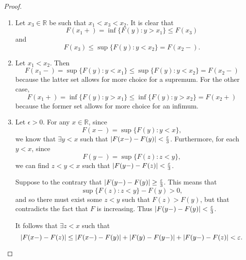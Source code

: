 \documentclass[notoc,notitlepage]{tufte-book}
\begin{document}
\begin{proof}
  \begin{enumerate}
    \item Let $x_3 \in \mathbb{R}$ be such that $x_1 < x_3 < x_2$.
      It is clear that
      \begin{equation*}
        F(x_1+) = \inf \{ F(y) : y > x_1 \} \leq F(x_3)
      \end{equation*}
      and
      \begin{equation*}
        F(x_3) \leq \sup \{ F(y) : y < x_2 \} = F(x_2-).
      \end{equation*}

    \item Let $x_1 < x_2$. Then
      \begin{equation*}
        F(x_1-) = \sup \{ F(y) : y < x_1 \} \leq \sup \{ F(y) : y < x_2 \} =
        F(x_2-)
      \end{equation*}
      because the latter set allows for more choice for a supremum.
      For the other case,
      \begin{equation*}
        F(x_1+) = \inf \{ F(y) : y > x_1 \} \leq \inf \{ F(y) : y > x_2 \} =
        F(x_2+)
      \end{equation*}
      because the former set allows for more choice for an infimum.

    \item Let $\epsilon > 0$. For any $x \in \mathbb{R}$, since
      \begin{equation*}
        F(x-) = \sup \{ F(y) : y < x \},
      \end{equation*}
      we know that $\exists y < x$ such that $\left|F(x-) - F(y)\right| <
      \frac{\varepsilon}{3}$.
      Furthermore, for each $y < x$, since
      \begin{equation*}
        F(y-) = \sup \{ F(z) : z < y \},
      \end{equation*}
      we can find $z < y < x$ such that $\left|F(y-) - F(z)\right| <
      \frac{\varepsilon}{3}$.

      Suppose to the contrary that $\left|F(y-) - F(y)\right| \geq \frac{\varepsilon}{3}$.
      This means that
      \begin{equation*}
        \sup \{ F(z) : z < y \} - F(y) > 0,
      \end{equation*}
      and so there must exist some $z < y$ such that $F(z) > F(y)$,
      but that contradicts the fact that $F$ is increasing.
      Thus $\left|F(y-) - F(y)\right| < \frac{\varepsilon}{3}$.

      It follows that $\exists z < x$ such that
      \begin{equation*}
        \left|F(x-) - F(z)\right| \leq \left|F(x-) - F(y)\right| + \left|F(y) - F(y-)\right| +
        \left|F(y-) - F(z)\right| < \varepsilon.
      \end{equation*}


\end{enumerate}
\end{proof}
\end{document}
